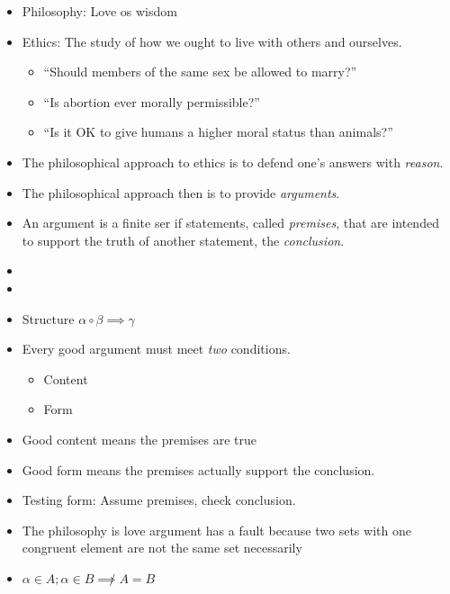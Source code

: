 \documentclass{article}
\begin{document}
    \begin{spacing}{1.2}
        \newpage
        \begin{itemize}
            \item Philosophy: Love os wisdom
            \item Ethics: The study of how we ought to live with others and ourselves.
            \begin{itemize}
                \item ``Should members of the same sex be allowed to marry?''
                \item ``Is abortion ever morally permissible?''
                \item ``Is it OK to give humans a higher moral status than animals?''
            \end{itemize}
            \item The philosophical approach to ethics is to defend one's answers with \emph{reason}.
            \item The philosophical approach then is to provide \emph{arguments}.
            \item An argument is a finite ser if statements, called \emph{premises}, that are intended to support the truth of another statement, the \emph{conclusion}.
            \item {}
            \item {}
            \item Structure \(\alpha \circ \beta \implies \gamma \)
            \item Every good argument must meet \emph{two} conditions.
            \begin{itemize}
                \item Content
                \item Form
            \end{itemize}
            \item Good content means the premises are true
            \item Good form means the premises actually support the conclusion.
            \item Testing form: Assume premises, check conclusion.
            \item The philosophy is love argument has a fault because two sets with one congruent element are not the same set necessarily
            \item \(\alpha\in A; \alpha\in B \not\implies A = B\)

\end{itemize}
\end{spacing}
\end{document}
